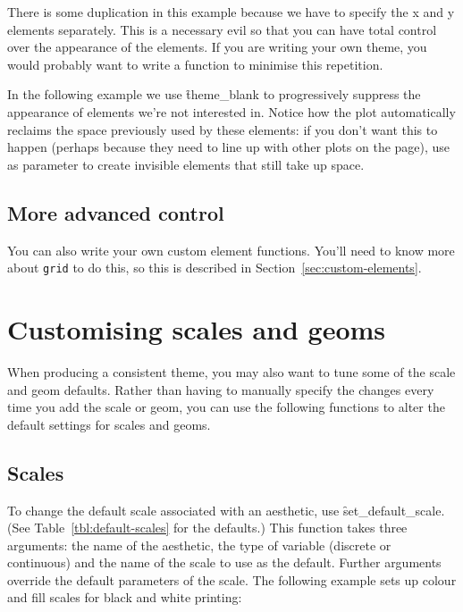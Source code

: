 There is some duplication in this example because we have to specify the x and y elements separately.  This is a necessary evil so that you can have total control over the appearance of the elements.  If you are writing your own theme, you would probably want to write a function to minimise this repetition.

In the following example we use \f{theme_blank} to progressively suppress the appearance of elements we're not interested in.   Notice how the plot automatically reclaims the space previously used by these elements: if you don't want this to happen (perhaps because they need to line up with other plots on the page), use  as parameter to create invisible elements that still take up space.

% 


\subsection{More advanced control}
\label{sub:more_advanced_control}

You can also write your own custom element functions.  You'll need to know more about {\tt grid} to do this, so this is described in Section~\ref{sec:custom-elements}.

\section{Customising scales and geoms}
\label{sec:theme-scale-geom}

When producing a consistent theme, you may also want to tune some of the scale and geom defaults.  Rather than having to manually specify the changes every time you add the scale or geom, you can use the following functions to alter the default settings for scales and geoms.

\subsection{Scales}
\label{sub:customise-scales}

To change the default scale associated with an aesthetic, use \f{set_default_scale}. (See Table~\ref{tbl:default-scales} for the defaults.)  This function takes three arguments: the name of the aesthetic, the type of variable (discrete or continuous) and the name of the scale to use as the default.  Further arguments override the default parameters of the scale.  The following example sets up colour and fill scales for black and white printing:

